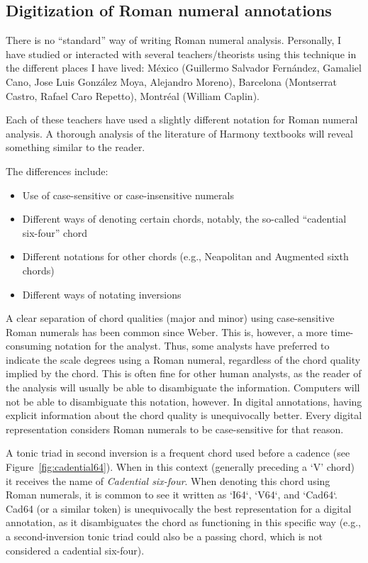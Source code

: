 \subsection{Digitization of Roman numeral annotations}
\label{sec:digitization_of_roman_numeral_annotations}

There is no ``standard'' way of writing Roman numeral analysis.
Personally, I have studied or interacted with several teachers/theorists using this technique in the different places I have lived: M\'exico (Guillermo Salvador Fern\'andez, Gamaliel Cano, Jose Luis Gonz\'alez Moya, Alejandro Moreno), Barcelona (Montserrat Castro, Rafael Caro Repetto), Montr\'eal (William Caplin).

Each of these teachers have used a slightly different notation for Roman numeral analysis. 
A thorough analysis of the literature of Harmony textbooks will reveal something similar to the reader.

The differences include:
\begin{itemize}
    \item Use of case-sensitive or case-insensitive numerals
    \item Different ways of denoting certain chords, notably, the so-called ``cadential six-four'' chord
    \item Different notations for other chords (e.g., Neapolitan and Augmented sixth chords)
    \item Different ways of notating inversions
\end{itemize}

A clear separation of chord qualities (major and minor) using case-sensitive Roman numerals has been common since Weber.
This is, however, a more time-consuming notation for the analyst.
Thus, some analysts have preferred to indicate the scale degrees using a Roman numeral, regardless of the chord quality implied by the chord.
This is often fine for other human analysts, as the reader of the analysis will usually be able to disambiguate the information.
Computers will not be able to disambiguate this notation, however.
In digital annotations, having explicit information about the chord quality is unequivocally better.
Every digital representation considers Roman numerals to be case-sensitive for that reason.

A tonic triad in second inversion is a frequent chord used before a cadence (see Figure~\ref{fig:cadential64}).
When in this context (generally preceding a `V' chord) it receives the name of \emph{Cadential six-four}.
When denoting this chord using Roman numerals, it is common to see it written as `I64`, `V64`, and `Cad64`.
Cad64 (or a similar token) is unequivocally the best representation for a digital annotation, as it disambiguates the chord as functioning in this specific way (e.g., a second-inversion tonic triad could also be a passing chord, which is not considered a cadential six-four). 

